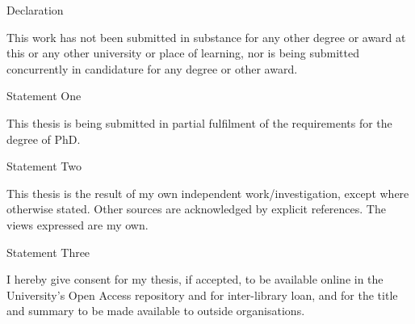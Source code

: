 \vfill
\begin{center}
\huge Declaration
\end{center}
This work has not been submitted in substance for any other degree or award at this or any other university or place of learning, nor is being submitted concurrently in candidature for any degree or other award.
\SignatureAndDate
\begin{center}
\huge Statement One
\end{center}
This thesis is being submitted in partial fulfilment of the requirements for the degree of PhD.
\SignatureAndDate
\begin{center}
\huge Statement Two
\end{center}
This thesis is the result of my own independent work/investigation, except where otherwise stated. Other sources are acknowledged by explicit references.  The views expressed are my own.
\SignatureAndDate
\begin{center}
\huge Statement Three
\end{center}
I hereby give consent for my thesis, if accepted, to be available online in the University's Open Access repository and for inter-library loan, and for the title and summary to be made available to outside organisations.
\SignatureAndDate
\vfill
